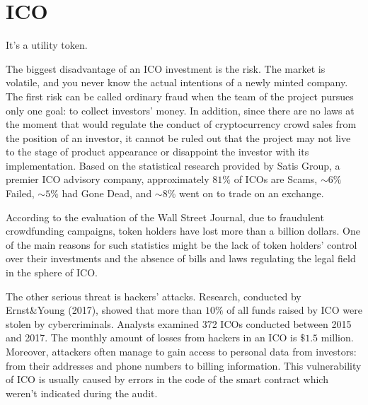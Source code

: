 \section{ICO}

It's a utility token.

The biggest disadvantage of an ICO investment is the risk. The market is volatile, and you never know the actual intentions of a newly minted company. The first risk can be called ordinary fraud when the team of the project pursues only one goal: to collect investors' money. In addition, since there are no laws at the moment that would regulate the conduct of cryptocurrency crowd sales from the position of an investor, it cannot be ruled out that the project may not live to the stage of product appearance or disappoint the investor with its implementation. Based on the statistical research provided by Satis Group, a premier ICO advisory company, approximately $81\%$ of ICOs are Scams, $\sim 6\%$ Failed, $\sim 5\%$ had Gone Dead, and $\sim 8\%$ went on to trade on an exchange.

According to the evaluation of the Wall Street Journal, due to fraudulent crowdfunding campaigns, token holders have lost more than a billion dollars. One of the main reasons for such statistics might be the lack of token holders' control over their investments and the absence of bills and laws regulating the legal field in the sphere of ICO.

The other serious threat is hackers' attacks. Research, conducted by Ernst\&Young (2017), showed that more than $10\%$ of all funds raised by ICO were stolen by cybercriminals. Analysts examined 372 ICOs conducted between 2015 and 2017. The monthly amount of losses from hackers in an ICO is $\$1.5$ million. Moreover, attackers often manage to gain access to personal data from investors: from their addresses and phone numbers to billing information. This vulnerability of ICO is usually caused by errors in the code of the smart contract which weren't indicated during the audit.

